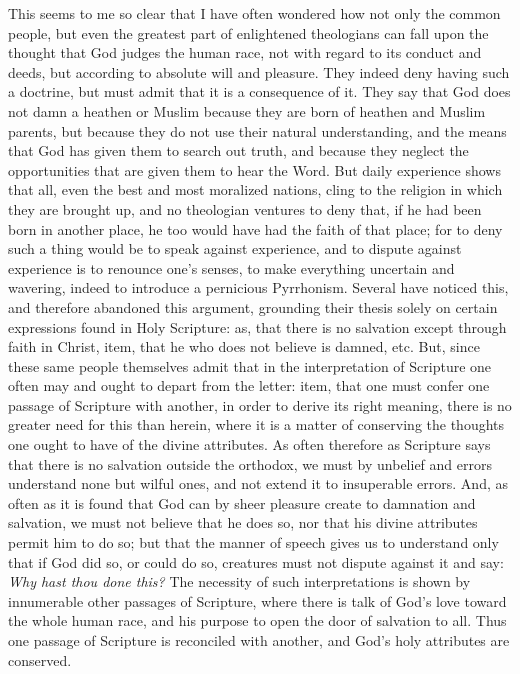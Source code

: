 \documentclass[12pt,a4paper,openany]{book}
\newcommand{\opage}[1]{\marginnote{\footnotesize\textit{[#1]}}}
\begin{document}
\setcounter{footnote}{0}%
\opage{27}This seems to me so clear that I have often wondered how not only the common
people, but even the greatest part of enlightened theologians can fall upon the
thought that God judges the human race, not with regard to its conduct and deeds,
but according to absolute will and pleasure. They indeed deny having such a
doctrine, but must admit that it is a consequence of it. They say that
God does not damn a heathen or Muslim because they are born of heathen and
Muslim parents, but because they do not use their natural understanding, and the
means that God has given them to search out truth, and because they neglect the
opportunities that are given them to hear the Word. But daily experience shows
that all, even the best and most moralized nations, cling to the religion in
which they are brought up, and no theologian ventures to deny that, if he had been
born in another place, he too would have had the faith of that place; for to deny
such a thing would be to speak against experience, and to dispute against
experience is to renounce one's senses, to make everything uncertain and
wavering, indeed to introduce a pernicious Pyrrhonism. Several have
noticed this, and therefore abandoned this argument, grounding their
thesis solely on certain expressions found in Holy Scripture: as, that
there is no salvation except through faith in Christ, item, that he who
does not believe is damned, etc. But, since these same people themselves admit
that in the interpretation of Scripture one often may and ought to depart from the
letter: item, that one must confer one passage of Scripture with
another, in order to derive its right meaning, there is no greater need for this
than herein, where it is a matter of conserving the thoughts one ought to
have of the divine attributes. As often therefore as Scripture says that there is
no salvation outside the orthodox, we must by unbelief and errors understand none
but wilful ones, and not extend it to insuperable errors. And, as often as
it is found that God can by sheer pleasure create to damnation and salvation, we
must
\setcounter{footnote}{0}%
\opage{28}not believe that he does so, nor that his divine attributes permit him to do
so; but that the manner of speech gives us to understand only that if God did so,
or could do so, creatures must not dispute against it and say: \emph{Why hast thou
done this?} The necessity of such interpretations is shown by innumerable other
passages of Scripture, where there is talk of God's love toward the whole human
race, and his purpose to open the door of salvation to all. Thus one passage of
Scripture is reconciled with another, and God's holy attributes
are conserved.
\end{document}
